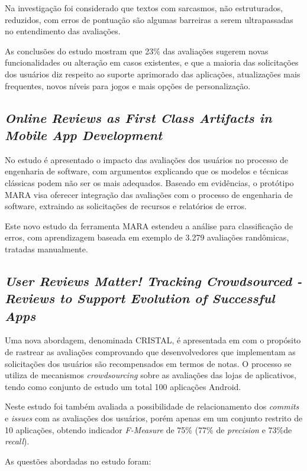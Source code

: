 Na investigação foi considerado que textos com sarcasmos, não estruturados, reduzidos, com erros de pontuação são algumas barreiras a serem ultrapassadas no entendimento das avaliações.

As conclusões do estudo mostram que 23\% das avaliações sugerem novas funcionalidades ou alteração em casos existentes, e que a maioria das solicitações dos usuários diz respeito ao suporte aprimorado das aplicações, atualizações mais frequentes, novos níveis para jogos e mais opções de personalização.

\subsection{\textit{Online Reviews as First Class Artifacts in Mobile App Development}}
No estudo \cite{Iacob2014online} é apresentado o impacto das avaliações dos usuários no processo de engenharia de software, com argumentos explicando que os modelos e técnicas clássicas podem não ser os mais adequados. Baseado em evidências, o protótipo MARA visa oferecer integração das avaliações com o processo de engenharia de software, extraindo as solicitações de recursos e relatórios de erros.

Este novo estudo da ferramenta MARA estendeu a análise para classificação de erros, com aprendizagem baseada em exemplo de 3.279 avaliações randômicas, tratadas manualmente.

\subsection{\textit{User Reviews Matter! Tracking Crowdsourced - Reviews to Support Evolution of Successful Apps}}
Uma nova abordagem, denominada CRISTAL, é apresentada em \cite{Palomba2015userreviews} com o propósito de rastrear as avaliações comprovando que desenvolvedores que implementam as solicitações dos usuários são recompensados em termos de notas. O processo se utiliza de mecanismos \textit{crowdsourcing} sobre as avaliações das lojas de aplicativos, tendo como conjunto de estudo um total 100 aplicações Android.

Neste estudo foi também avaliada a possibilidade de relacionamento dos \textit{commits} e \textit{issues} com as avaliações dos usuários, porém apenas em um conjunto restrito de 10 aplicações, obtendo indicador \textit{F-Measure} de 75\% (77\% de \textit{precision} e 73\%de \textit{recall}).

As questões abordadas no estudo foram:


